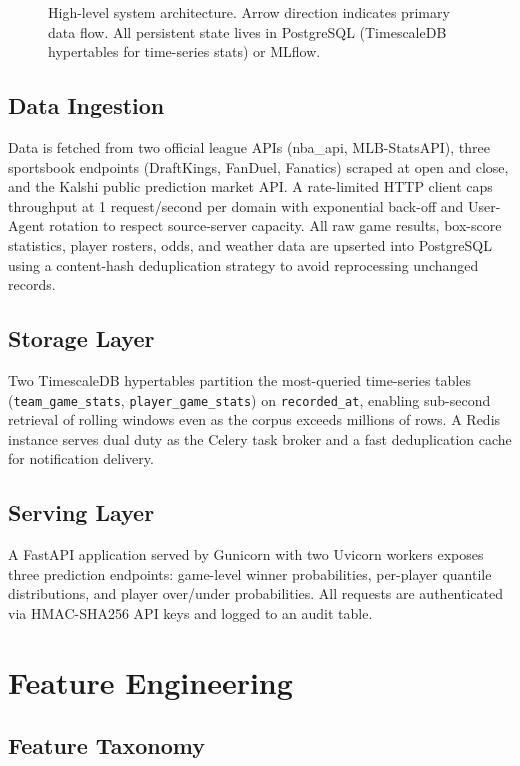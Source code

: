 \documentclass[conference]{IEEEtran}
\begin{document}
\begin{figure}[t]
\begin{tikzpicture}
\end{tikzpicture}
\caption{High-level system architecture.  Arrow direction indicates
primary data flow.  All persistent state lives in PostgreSQL
(TimescaleDB hypertables for time-series stats) or MLflow.}
\label{fig:arch}
\end{figure}

\subsection{Data Ingestion}
Data is fetched from two official league APIs (nba\_api,
MLB-StatsAPI), three sportsbook endpoints (DraftKings, FanDuel,
Fanatics) scraped at open and close, and the Kalshi public prediction
market API.  A rate-limited HTTP client caps throughput at 1
request/second per domain with exponential back-off and User-Agent
rotation to respect source-server capacity.  All raw game results,
box-score statistics, player rosters, odds, and weather data are
upserted into PostgreSQL using a content-hash deduplication strategy to
avoid reprocessing unchanged records.

\subsection{Storage Layer}
Two TimescaleDB hypertables partition the most-queried time-series
tables (\texttt{team\_game\_stats}, \texttt{player\_game\_stats}) on
\texttt{recorded\_at}, enabling sub-second retrieval of rolling windows
even as the corpus exceeds millions of rows.  A Redis instance serves
dual duty as the Celery task broker and a fast deduplication cache for
notification delivery.

\subsection{Serving Layer}
A FastAPI application served by Gunicorn with two Uvicorn workers
exposes three prediction endpoints: game-level winner probabilities,
per-player quantile distributions, and player over/under probabilities.
All requests are authenticated via HMAC-SHA256 API keys and logged to
an audit table.

\section{Feature Engineering}
\label{sec:features}

\subsection{Feature Taxonomy}
\end{document}
